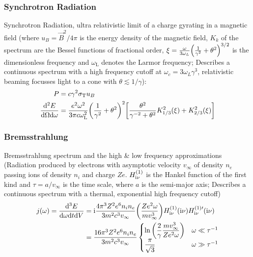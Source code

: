 		\subsubsection{Synchrotron Radiation}
			\noindent
			Synchrotron Radiation, ultra relativistic limit of a charge gyrating in a magnetic field (where $u_B=\vec{B}^2/4\pi$ is the energy density of the magnetic field, $K_k$ of the spectrum are the Bessel functions of fractional order, $\xi=\frac{\omega}{3\omega_L}\qty(\frac{1}{\gamma^2}+\theta^2)^{3/2}$ is the dimensionless frequency and $\omega_\text{L}$ denotes the Larmor frequency; Describes a continuous spectrum with a high frequency cutoff at $\omega_c = 3\omega_L \gamma^3$, relativistic beaming focusses light to a cone with $\theta \lesssim 1/\gamma$):
			\begin{equation}
				\begin{aligned}
					P &= c \gamma^2 \sigma_\text{T} u_B \\
					\frac{\dd^2 E}{\dd\Omega\dd\omega} &= \frac{e^2 \omega^2}{3\pi c\omega_\text{L}^2} \qty(\frac{1}{\gamma^2} + \theta^2)^2\qty[\frac{\theta^2}{\gamma^{-2}+\theta^2} K_{1/3}^2(\xi) + K_{2/3}^2(\xi)]\\
				\end{aligned}
			\end{equation}

		\subsubsection{Bremsstrahlung}
			\noindent
			Bremsstrahlung spectrum and the high \& low frequency approximations (Radiation produced by electrons with asymptotic velocity $v_\infty$ of density $n_e$ passing ions of density $n_i$ and charge $Ze$. $H_{\mathrm{i} \nu}^{(1)}$ is the Hankel function of the first kind and $\tau=a / v_\infty$ is the time scale, where $a$ is the semi-major axis; Describes a continuous spectrum with a thermal, exponential high frequency cutoff)
			\begin{equation}
				\begin{aligned}
					j(\omega) = \frac{\dd[3] E}{\dd \omega \dd t \dd V} &= \mathrm{i} \frac{4\pi^3 Z^2 e^6 n_i n_e}{3m^2 c^3 v_\infty}\qty(\frac{Z e^2 \omega}{m v_\infty^3}) H_{\mathrm{i} \nu}^{(1)}(\mathrm{i}\nu) H_{\mathrm{i} \nu}^{(1)\prime}(\mathrm{i}\nu) \\
					&= \frac{16\pi^3 Z^2 e^6 n_i n_e}{3m^2 c^3 v_\infty}
					\begin{cases}
						\ln\qty(\dfrac{2}{\gamma}\dfrac{m v_{\infty}^3}{Z e^2 \omega}) & \omega \ll \tau^{-1}  \\
						\dfrac{\pi}{\sqrt{3}} & \omega \gg \tau^{-1}  \\
					\end{cases}\\
				\end{aligned}
			\end{equation}

